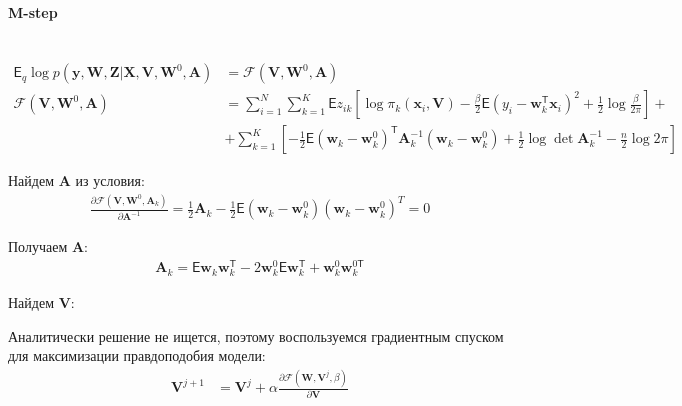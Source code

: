 \documentclass[12pt, twoside]{article}
\numberwithin{equation}{section}
\begin{document}
\paragraph{M-step}~
\begin{equation}
\label{eq:st:lin:6}
\begin{aligned}
\mathsf{E}_{q} \log p\left(\textbf{y}, \textbf{W}, \textbf{Z}|\textbf{X}, \textbf{V}, \textbf{W}^{0}, \textbf{A}\right) &= \mathcal{F}\left(\textbf{V}, \textbf{W}^{0}, \textbf{A}\right) \\
\mathcal{F}\left(\textbf{V}, \textbf{W}^{0}, \textbf{A}\right) &= \sum_{i=1}^{N}\sum_{k=1}^{K}\mathsf{E}z_{ik}\left[\log\pi_k\left(\textbf{x}_i, \textbf{V}\right) - \frac{\beta}{2}\mathsf{E}\left(y_{i} - \textbf{w}_{k}^{\mathsf{T}}\textbf{x}_{i}\right)^{2} + \frac{1}{2}\log\frac{\beta}{2\pi}\right] +\\
&+ \sum_{k=1}^{K}\left[-\frac{1}{2}\mathsf{E}\left(\textbf{w}_{k} - \textbf{w}_{k}^{0}\right)^{\mathsf{T}}\textbf{A}_{k}^{-1}\left(\textbf{w}_{k} - \textbf{w}_{k}^{0}\right) + \frac{1}{2}\log\det\textbf{A}^{-1}_{k} - \frac{n}{2}\log2\pi\right]
\end{aligned}
\end{equation}

Найдем $\textbf{A}$ из условия:
\begin{equation}
\label{eq:st:lin:7}
\begin{aligned}
\frac{\partial \mathcal{F}\left(\textbf{V}, \textbf{W}^{0}, \textbf{A}_{k}\right)}{\partial \textbf{A}^{-1}} =  \frac{1}{2}\textbf{A}_{k} - \frac{1}{2}\mathsf{E}\left(\textbf{w}_{k} - \textbf{w}_{k}^{0}\right)\left(\textbf{w}_{k} - \textbf{w}_{k}^{0}\right)^{T} = 0 
\end{aligned}
\end{equation}

Получаем $\textbf{A}$:
\begin{equation}
\label{eq:st:lin:8}
\begin{aligned}
\textbf{A}_{k} = \mathsf{E}\textbf{w}_{k}\textbf{w}_{k}^{\mathsf{T}} - 2\textbf{w}_{k}^{0}\mathsf{E}\textbf{w}_{k}^{\mathsf{T}} + \textbf{w}_{k}^{0}\textbf{w}_{k}^{0\mathsf{T}} 
\end{aligned}
\end{equation}

Найдем $\textbf{V}$:

Аналитически решение не ищется, поэтому воспользуемся градиентным спуском для максимизации правдоподобия модели:
\begin{equation}
\label{eq:st:lin:9}
\begin{aligned}
\textbf{V}^{j+1} &= \textbf{V}^{j} + \alpha\frac{\partial \mathcal{F}\left(\textbf{W}, \textbf{V}^{j}, \beta\right)}{\partial \textbf{V}} 
\end{aligned}
\end{equation}
\end{document}
